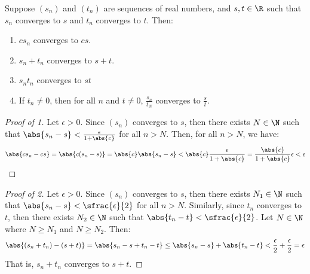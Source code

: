 \begin{thmbox}{}{}
    Suppose $(s_n)$ and $(t_n)$ are sequences of real numbers, and $s,t \in \R$ such that $s_n$ converges to $s$ and $t_n$ converges to $t$. Then:
    \begin{enumerate}
        \item $cs_n$ converges to $cs$.
        \item $s_n + t_n$ converges to $s+t$.
        \item $s_nt_n$ converges to $st$
        \item If $t_n \neq 0$, then for all $n$ and $t \neq 0$, $\frac{s_n}{t_N}$ converges to $\frac{s}{t}$.
    \end{enumerate}
    \tcblower
    \begin{proof}[Proof of 1]
        Let $\epsilon > 0$. Since $(s_n)$ converges to $s$, then there exists $N \in \N$ such that $\abs{s_n - s} < \frac{\epsilon}{1 + \abs{c}}$ for all $n > N$. Then, for all $n > N$, we have:
        \[ \abs{cs_n - cs} = \abs{c(s_n-s)} = \abs{c}\abs{s_n-s} < \abs{c} \frac{\epsilon}{1+\abs{c}} = \frac{\abs{c}}{1+\abs{c}} \epsilon < \epsilon \]
    \end{proof}

    \begin{proof}[Proof of 2]
        Let $\epsilon > 0$. Since $(s_n)$ converges to $s$, then there exists $N_1 \in \N$ such that $\abs{s_n - s} < \sfrac{\epsilon}{2}$ for all $n > N$. Similarly, since $t_n$ converges to $t$, then there exists $N_2 \in \N$ such that $\abs{t_n - t} < \sfrac{\epsilon}{2}$. Let $N \in \N$ where $N \geq N_1$ and $N \geq N_2$. Then:
        \[ \abs{(s_n + t_n) - (s + t)} = \abs{s_n - s + t_n - t} \leq \abs{s_n - s} + \abs{t_n - t} < \frac{\epsilon}{2} + \frac{\epsilon}{2} = \epsilon \]
        That is, $s_n + t_n$ converges to $s + t$.
    \end{proof}


\end{thmbox}
